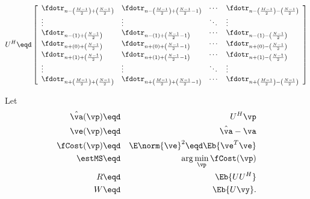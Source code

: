 \[
   U^H \eqd
   \left[\begin{array}{llll}
      \fdotr_{n-\left(\frac{M-1}{2}\right)+\left(\frac{N-1}{2}\right)}    & \fdotr_{n-\left(\frac{M-1}{2}\right)+\left(\frac{N-1}{2}-1\right)}  & \cdots & \fdotr_{n-\left(\frac{M-1}{2}\right)-\left(\frac{N-1}{2}\right)}  \\
      \vdots                                                                & \vdots                                                                & \ddots & \vdots                                                                \\
      \fdotr_{n-(1)+\left(\frac{N-1}{2}\right)}                           & \fdotr_{n-(1)+\left(\frac{N-1}{2}-1\right)}                         & \cdots & \fdotr_{n-(1)-\left(\frac{N-1}{2}\right)}                         \\
      \fdotr_{n+(0)+\left(\frac{N-1}{2}\right)}                           & \fdotr_{n+(0)+\left(\frac{N-1}{2}-1\right)}                         & \cdots & \fdotr_{n+(0)-\left(\frac{N-1}{2}\right)}                         \\
      \fdotr_{n+(1)+\left(\frac{N-1}{2}\right)}                           & \fdotr_{n+(1)+\left(\frac{N-1}{2}-1\right)}                         & \cdots & \fdotr_{n+(1)-\left(\frac{N-1}{2}\right)}                         \\
      \vdots                                                                & \vdots                                                                & \ddots & \vdots                                                                \\
      \fdotr_{n+\left(\frac{M-1}{2}\right)+\left(\frac{N-1}{2}\right)}    & \fdotr_{n+\left(\frac{M-1}{2}\right)+\left(\frac{N-1}{2}-1\right)}  & \cdots & \fdotr_{n+\left(\frac{M-1}{2}\right)-\left(\frac{N-1}{2}\right)}
   \end{array}\right]
\]


Let
\begin{eqnarray*}
   \hat{\va}(\vp)   &\eqd& U^H\vp    \\
   \ve(\vp)    &\eqd& \hat{\va}-\va \\
   \fCost(\vp) &\eqd& \E\norm{\ve}^2 \eqd \Eb{\ve^T\ve} \\
   \estMS      &\eqd& \arg\min_\vp \fCost(\vp)  \\
   R           &\eqd& \Eb{UU^H} \\
   W           &\eqd& \Eb{ U\vy}.
\end{eqnarray*}

